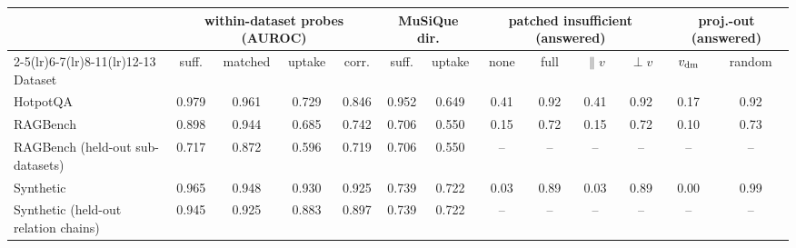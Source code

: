 \begin{tabular}{lcccccccccccc}
\toprule
& \multicolumn{4}{c}{within-dataset probes (AUROC)} & \multicolumn{2}{c}{MuSiQue dir.} & \multicolumn{4}{c}{patched insufficient (answered)} & \multicolumn{2}{c}{proj.-out (answered)} \\
\cmidrule(lr){2-5}\cmidrule(lr){6-7}\cmidrule(lr){8-11}\cmidrule(lr){12-13}
Dataset & suff. & matched & uptake & corr. & suff. & uptake & none & full & $\parallel v$ & $\perp v$ & $v_{\mathrm{dm}}$ & random \\
\midrule
HotpotQA & 0.979 & 0.961 & 0.729 & 0.846 & 0.952 & 0.649 & 0.41 & 0.92 & 0.41 & 0.92 & 0.17 & 0.92 \\
RAGBench & 0.898 & 0.944 & 0.685 & 0.742 & 0.706 & 0.550 & 0.15 & 0.72 & 0.15 & 0.72 & 0.10 & 0.73 \\
RAGBench (held-out sub-datasets) & 0.717 & 0.872 & 0.596 & 0.719 & 0.706 & 0.550 & -- & -- & -- & -- & -- & -- \\
Synthetic & 0.965 & 0.948 & 0.930 & 0.925 & 0.739 & 0.722 & 0.03 & 0.89 & 0.03 & 0.89 & 0.00 & 0.99 \\
Synthetic (held-out relation chains) & 0.945 & 0.925 & 0.883 & 0.897 & 0.739 & 0.722 & -- & -- & -- & -- & -- & -- \\
\bottomrule
\end{tabular}